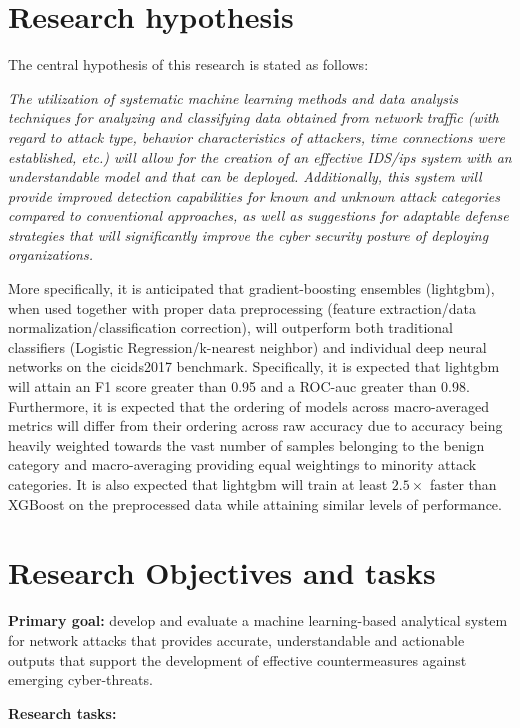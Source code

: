 \section{Research hypothesis}

The central hypothesis of this research is stated as follows:

{\it The utilization of systematic machine learning methods and data analysis techniques for analyzing and classifying data obtained from network traffic (with regard to attack type, behavior characteristics of attackers, time connections were established, etc.) will allow for the creation of an effective IDS/ips system with an understandable model and that can be deployed. Additionally, this system will provide improved detection capabilities for known and unknown attack categories compared to conventional approaches, as well as suggestions for adaptable defense strategies that will significantly improve the cyber security posture of deploying organizations.}

More specifically, it is anticipated that gradient-boosting ensembles (lightgbm), when used together with proper data preprocessing (feature extraction/data normalization/classification correction), will outperform both traditional classifiers (Logistic Regression/k-nearest neighbor) and individual deep neural networks on the cicids2017 benchmark. Specifically, it is expected that lightgbm will attain an F1 score greater than 0.95 and a ROC-auc greater than 0.98. Furthermore, it is expected that the ordering of models across macro-averaged metrics will differ from their ordering across raw accuracy due to accuracy being heavily weighted towards the vast number of samples belonging to the benign category and macro-averaging providing equal weightings to minority attack categories. It is also expected that lightgbm will train at least $2.5\times$ faster than XGBoost on the preprocessed data while attaining similar levels of performance.

\section{Research Objectives and tasks}

{\bf Primary goal:} develop and evaluate a machine learning-based analytical system for network attacks that provides accurate, understandable and actionable outputs that support the development of effective countermeasures against emerging cyber-threats.

{\bf Research tasks:}


